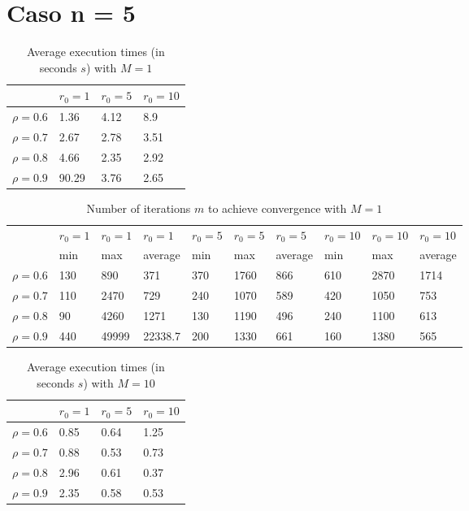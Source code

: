 \documentclass[a4paper,11pt,openright]{report}
\begin{document}
\section*{Caso n = 5} 
\begin{table}[H]
\centering
\addtolength{\leftskip}{-1.5cm}
\addtolength{\rightskip}{-1.5cm}
\begin{tabular}{|c|lll|}
\hline
$ $ & $r_0 = 1$ & $r_0 = 5$ & $r_0 = 10$ \\
\hline
$\rho = 0.6$ & 1.36 & 4.12 & 8.9 \\

$\rho = 0.7$ & 2.67 & 2.78 & 3.51 \\

$\rho = 0.8$ & 4.66 & 2.35 & 2.92 \\

$\rho = 0.9$ & 90.29 & 3.76 & 2.65 \\
\hline
\end{tabular}
\caption{Average execution
 times (in seconds $s$) with $M = 1$}
\end{table}
\begin{table}[H]
\centering
\addtolength{\leftskip}{-1.5cm}
\addtolength{\rightskip}{-1.5cm}
\begin{tabular}{|c|lllllllll|}
\hline
$ $ & $r_0 = 1$ & $r_0 = 1$ & $r_0 = 1$ & $r_0 = 5$ & $r_0 = 5$ & $r_0 = 5$ & $r_0 = 10$ & $r_0 = 10$ & $r_0 = 10$  \\
$ $ & min & max & average & min & max & average & min & max & average \\ 
\hline
$\rho = 0.6$ & 130 & 890 & 371 & 370 & 1760 & 866 & 610 & 2870 & 1714 \\

$\rho = 0.7$ & 110 & 2470 & 729 & 240 & 1070 & 589 & 420 & 1050 & 753\\

$\rho = 0.8$ & 90 & 4260 & 1271 & 130 & 1190 & 496 & 240 & 1100 & 613\\

$\rho = 0.9$ & 440 & 49999 & 22338.7 & 200 & 1330 & 661 & 160 & 1380 & 565\\
\hline
\end{tabular}
\caption{Number of iterations $m$ to achieve convergence with $M = 1$}
\end{table}
\begin{table}[H]
\centering
\addtolength{\leftskip}{-1.5cm}
\addtolength{\rightskip}{-1.5cm}
\begin{tabular}{|c|lll|}
\hline
$ $ & $r_0 = 1$ & $r_0 = 5$ & $r_0 = 10$ \\
\hline
$\rho = 0.6$ & 0.85 & 0.64 & 1.25 \\

$\rho = 0.7$ & 0.88 & 0.53 & 0.73 \\

$\rho = 0.8$ & 2.96 & 0.61 & 0.37 \\

$\rho = 0.9$ & 2.35 & 0.58 & 0.53 \\
\hline
\end{tabular}
\caption{Average execution
 times (in seconds $s$) with $M = 10$}
\end{table}
\end{document}
